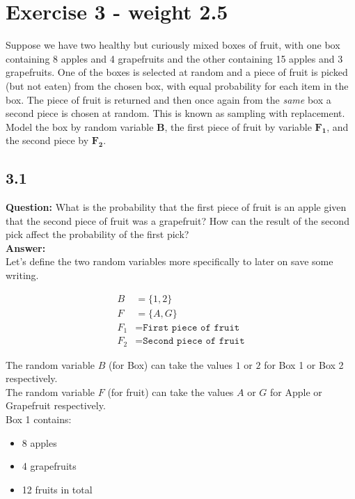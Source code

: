 \documentclass[a4paper]{article}
\begin{document}
\section*{Exercise 3 - weight 2.5}


Suppose we have two healthy but curiously mixed boxes of fruit, with one box containing 8 apples and 4 grapefruits and the other containing 15 apples and 3 grapefruits. One of the boxes is selected at random and a piece of fruit is picked (but not eaten) from the chosen box, with equal probability for each item in the box. The piece of fruit is returned and then once again from the \textit{same} box a second piece is chosen at random. This is known as sampling with replacement. Model the box by random variable $\boldsymbol{B}$, the first piece of fruit by variable $\boldsymbol{F_1}$, and the second piece by $\boldsymbol{F_2}$.


\subsection*{3.1}

\textbf{Question:} What is the probability that the first piece of fruit is an apple given that the second piece of fruit was a grapefruit? How can the result of the second pick affect the probability of the first pick?\\

\textbf{Answer:}\\

Let's define the two random variables more specifically to later on save some writing. 

\begin{align*}
	B &= \{ 1,2\}\\
	F &= \{ A,G \}\\
	F_1 &= \texttt{First piece of fruit}\\
	F_2 &= \texttt{Second piece of fruit}
\end{align*}

The random variable $B$ (for Box) can take the values $1$ or $2$ for Box 1 or Box 2 respectively.\\
The random variable $F$ (for fruit) can take the values $A$ or $G$ for Apple or Grapefruit respectively.\\ 

Box 1 contains:

\begin{itemize}
	\item 8 apples
	\item 4 grapefruits
	\item 12 fruits in total
\end{itemize}
\end{document}
